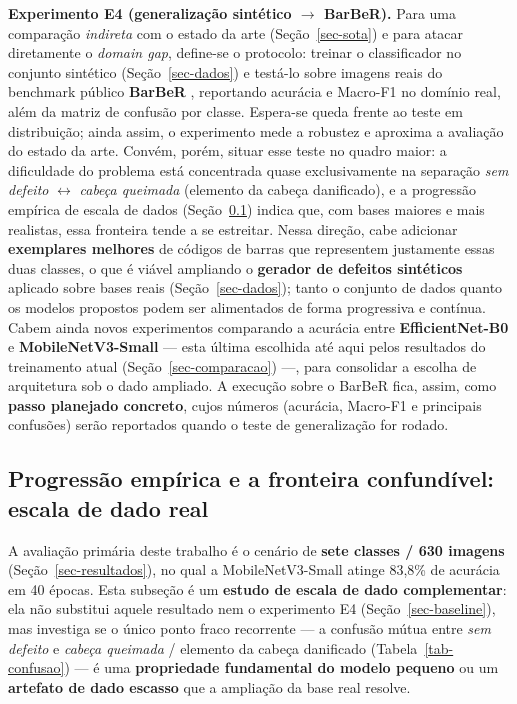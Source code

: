 \documentclass[
	article,			%
	11pt,				%
	oneside,			%
	a4paper,			%
	english,			%
	brazilian,			%
	sumario=tradicional
	]{abntex2}
\begin{document}
\noindent\textbf{Experimento E4 (generalização sintético $\rightarrow$ BarBeR).}
Para uma comparação \emph{indireta} com o estado da arte
\cite{duan2025barcode} (Seção~\ref{sec-sota}) e para atacar diretamente o
\textit{domain gap}, define-se o protocolo: treinar o classificador no conjunto
sintético (Seção~\ref{sec-dados}) e testá-lo sobre imagens reais do benchmark
público \textbf{BarBeR} \cite{duan2025barcode}, reportando acurácia e Macro-F1 no
domínio real, além da matriz de confusão por classe. Espera-se queda frente ao
teste em distribuição; ainda assim, o experimento mede a robustez e aproxima a
avaliação do estado da arte. Convém, porém, situar esse teste no quadro maior: a
dificuldade do problema está concentrada quase exclusivamente na separação
\emph{sem defeito} $\leftrightarrow$ \emph{cabeça queimada} (elemento da cabeça
danificado), e a progressão empírica de escala de dados (Seção~\ref{sec-progressao})
indica que, com bases maiores e mais realistas, essa fronteira tende a se
estreitar. Nessa direção, cabe adicionar \textbf{exemplares melhores} de códigos
de barras que representem justamente essas duas classes, o que é viável ampliando
o \textbf{gerador de defeitos sintéticos} aplicado sobre bases reais
(Seção~\ref{sec-dados}); tanto o conjunto de dados quanto os modelos propostos
podem ser alimentados de forma progressiva e contínua. Cabem ainda novos
experimentos comparando a acurácia entre \textbf{EfficientNet-B0} e
\textbf{MobileNetV3-Small} --- esta última escolhida até aqui pelos resultados do
treinamento atual (Seção~\ref{sec-comparacao}) ---, para consolidar a escolha de
arquitetura sob o dado ampliado. A execução sobre o BarBeR fica, assim, como
\textbf{passo planejado concreto}, cujos números (acurácia, Macro-F1 e principais
confusões) serão reportados quando o teste de generalização for rodado.

\subsection{Progressão empírica e a fronteira confundível: escala de dado real}\label{sec-progressao}

A avaliação primária deste trabalho é o cenário de \textbf{sete classes / 630 imagens}
(Seção~\ref{sec-resultados}), no qual a MobileNetV3-Small atinge 83,8\% de acurácia em
40 épocas. Esta subseção é um \textbf{estudo de escala de dado complementar}: ela não
substitui aquele resultado nem o experimento E4 (Seção~\ref{sec-baseline}), mas
investiga se o único ponto fraco recorrente --- a confusão mútua entre \emph{sem
defeito} e \emph{cabeça queimada} / elemento da cabeça danificado
(Tabela~\ref{tab-confusao}) --- é uma \textbf{propriedade fundamental do modelo
pequeno} ou um \textbf{artefato de dado escasso} que a ampliação da base real resolve.
\end{document}
